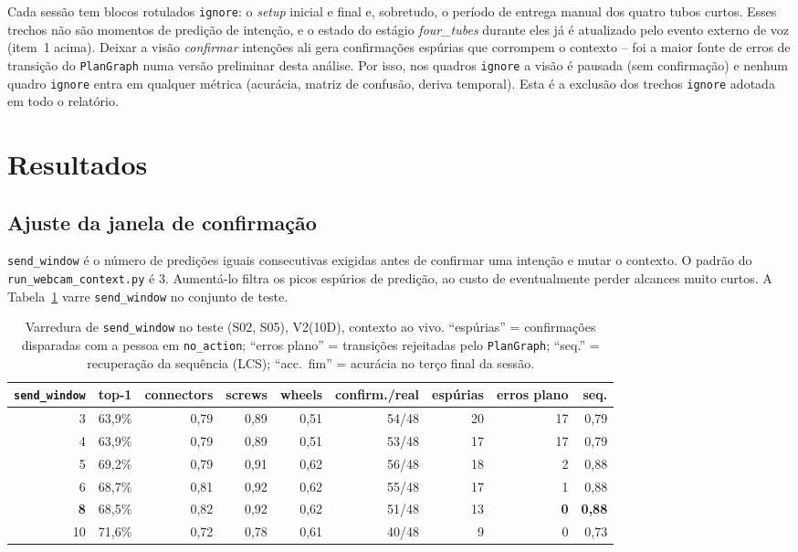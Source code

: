 \documentclass[11pt]{article}
\begin{document}
Cada sessão tem blocos rotulados \texttt{ignore}: o \emph{setup} inicial e final
e, sobretudo, o período de entrega manual dos quatro tubos curtos. Esses
trechos não são momentos de predição de intenção, e o estado do estágio
\emph{four\_tubes} durante eles já é atualizado pelo evento externo de voz
(item~1 acima). Deixar a visão \emph{confirmar} intenções ali gera confirmações
espúrias que corrompem o contexto -- foi a maior fonte de erros de transição do
\texttt{PlanGraph} numa versão preliminar desta análise. Por isso, nos quadros
\texttt{ignore} a visão é pausada (sem confirmação) e nenhum quadro
\texttt{ignore} entra em qualquer métrica (acurácia, matriz de confusão, deriva
temporal). Esta é a exclusão dos trechos \texttt{ignore} adotada em todo o
relatório.

\section{Resultados}
\label{sec:resultados}

\subsection{Ajuste da janela de confirmação}
\label{sec:ajuste-sw}

\texttt{send\_window} é o número de predições iguais consecutivas exigidas antes
de confirmar uma intenção e mutar o contexto. O padrão do
\texttt{run\_webcam\_context.py} é 3. Aumentá-lo filtra os picos espúrios de
predição, ao custo de eventualmente perder alcances muito curtos. A
Tabela~\ref{tab:sweep} varre \texttt{send\_window} no conjunto de teste.

\begin{table}[h]
\centering
\caption{Varredura de \texttt{send\_window} no teste (S02, S05), V2(10D),
contexto ao vivo. ``espúrias'' = confirmações disparadas com a pessoa em
\texttt{no\_action}; ``erros plano'' = transições rejeitadas pelo
\texttt{PlanGraph}; ``seq.'' = recuperação da sequência (LCS); ``acc.\ fim'' =
acurácia no terço final da sessão.}
\label{tab:sweep}
\begin{tabular}{rrrrrrrrr}
\toprule
\texttt{send\_window} & top-1 & connectors & screws & wheels & confirm./real & espúrias & erros plano & seq. \\
\midrule
3            & 63,9\% & 0,79 & 0,89 & 0,51 & 54/48 & 20 & 17 & 0,79 \\
4            & 63,9\% & 0,79 & 0,89 & 0,51 & 53/48 & 17 & 17 & 0,79 \\
5            & 69,2\% & 0,79 & 0,91 & 0,62 & 56/48 & 18 & 2  & 0,88 \\
6            & 68,7\% & 0,81 & 0,92 & 0,62 & 55/48 & 17 & 1  & 0,88 \\
\textbf{8}   & 68,5\% & 0,82 & 0,92 & 0,62 & 51/48 & 13 & \textbf{0} & \textbf{0,88} \\
10           & 71,6\% & 0,72 & 0,78 & 0,61 & 40/48 & 9  & 0  & 0,73 \\
\bottomrule
\end{tabular}
\end{table}
\end{document}
